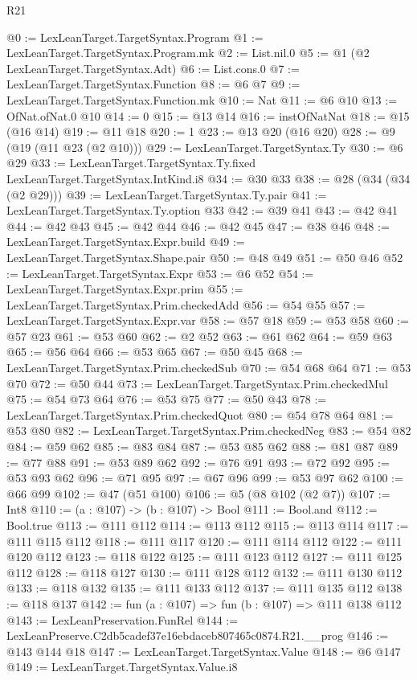 \begin{lexlean}{R21}
\begin{coremodule}
@0 := LexLeanTarget.TargetSyntax.Program
@1 := LexLeanTarget.TargetSyntax.Program.mk
@2 := List.nil.{0}
@5 := @1 (@2 LexLeanTarget.TargetSyntax.Adt)
@6 := List.cons.{0}
@7 := LexLeanTarget.TargetSyntax.Function
@8 := @6 @7
@9 := LexLeanTarget.TargetSyntax.Function.mk
@10 := Nat
@11 := @6 @10
@13 := OfNat.ofNat.{0} @10
@14 := 0
@15 := @13 @14
@16 := instOfNatNat
@18 := @15 (@16 @14)
@19 := @11 @18
@20 := 1
@23 := @13 @20 (@16 @20)
@28 := @9 (@19 (@11 @23 (@2 @10)))
@29 := LexLeanTarget.TargetSyntax.Ty
@30 := @6 @29
@33 := LexLeanTarget.TargetSyntax.Ty.fixed LexLeanTarget.TargetSyntax.IntKind.i8
@34 := @30 @33
@38 := @28 (@34 (@34 (@2 @29)))
@39 := LexLeanTarget.TargetSyntax.Ty.pair
@41 := LexLeanTarget.TargetSyntax.Ty.option @33
@42 := @39 @41
@43 := @42 @41
@44 := @42 @43
@45 := @42 @44
@46 := @42 @45
@47 := @38 @46
@48 := LexLeanTarget.TargetSyntax.Expr.build
@49 := LexLeanTarget.TargetSyntax.Shape.pair
@50 := @48 @49
@51 := @50 @46
@52 := LexLeanTarget.TargetSyntax.Expr
@53 := @6 @52
@54 := LexLeanTarget.TargetSyntax.Expr.prim
@55 := LexLeanTarget.TargetSyntax.Prim.checkedAdd
@56 := @54 @55
@57 := LexLeanTarget.TargetSyntax.Expr.var
@58 := @57 @18
@59 := @53 @58
@60 := @57 @23
@61 := @53 @60
@62 := @2 @52
@63 := @61 @62
@64 := @59 @63
@65 := @56 @64
@66 := @53 @65
@67 := @50 @45
@68 := LexLeanTarget.TargetSyntax.Prim.checkedSub
@70 := @54 @68 @64
@71 := @53 @70
@72 := @50 @44
@73 := LexLeanTarget.TargetSyntax.Prim.checkedMul
@75 := @54 @73 @64
@76 := @53 @75
@77 := @50 @43
@78 := LexLeanTarget.TargetSyntax.Prim.checkedQuot
@80 := @54 @78 @64
@81 := @53 @80
@82 := LexLeanTarget.TargetSyntax.Prim.checkedNeg
@83 := @54 @82
@84 := @59 @62
@85 := @83 @84
@87 := @53 @85 @62
@88 := @81 @87
@89 := @77 @88
@91 := @53 @89 @62
@92 := @76 @91
@93 := @72 @92
@95 := @53 @93 @62
@96 := @71 @95
@97 := @67 @96
@99 := @53 @97 @62
@100 := @66 @99
@102 := @47 (@51 @100)
@106 := @5 (@8 @102 (@2 @7))
@107 := Int8
@110 := (a : @107) -> (b : @107) -> Bool
@111 := Bool.and
@112 := Bool.true
@113 := @111 @112
@114 := @113 @112
@115 := @113 @114
@117 := @111 @115 @112
@118 := @111 @117
@120 := @111 @114 @112
@122 := @111 @120 @112
@123 := @118 @122
@125 := @111 @123 @112
@127 := @111 @125 @112
@128 := @118 @127
@130 := @111 @128 @112
@132 := @111 @130 @112
@133 := @118 @132
@135 := @111 @133 @112
@137 := @111 @135 @112
@138 := @118 @137
@142 := fun (a : @107) => fun (b : @107) => @111 @138 @112
@143 := LexLeanPreservation.FunRel
@144 := LexLeanPreserve.C2db5cadef37e16ebdaceb807465c0874.R21.__prog
@146 := @143 @144 @18
@147 := LexLeanTarget.TargetSyntax.Value
@148 := @6 @147
@149 := LexLeanTarget.TargetSyntax.Value.i8

\end{coremodule}
\end{lexlean}
